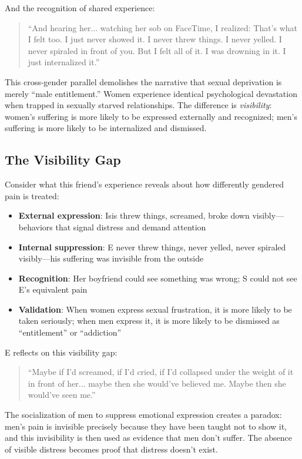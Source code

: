 \documentclass[12pt,openany]{book}
\numberwithin{equation}{chapter}
\begin{document}
And the recognition of shared experience:

\begin{quote}
``And hearing her... watching her sob on FaceTime, I realized: That's what I felt too. I just never showed it. I never threw things. I never yelled. I never spiraled in front of you. But I felt all of it. I was drowning in it. I just internalized it.''
\end{quote}

This cross-gender parallel demolishes the narrative that sexual deprivation is merely ``male entitlement.'' Women experience identical psychological devastation when trapped in sexually starved relationships. The difference is \textit{visibility}: women's suffering is more likely to be expressed externally and recognized; men's suffering is more likely to be internalized and dismissed.

\subsection{The Visibility Gap}

Consider what this friend's experience reveals about how differently gendered pain is treated:

\begin{itemize}
    \item \textbf{External expression}: Isis threw things, screamed, broke down visibly---behaviors that signal distress and demand attention
    \item \textbf{Internal suppression}: E never threw things, never yelled, never spiraled visibly---his suffering was invisible from the outside
    \item \textbf{Recognition}: Her boyfriend could see something was wrong; S could not see E's equivalent pain
    \item \textbf{Validation}: When women express sexual frustration, it is more likely to be taken seriously; when men express it, it is more likely to be dismissed as ``entitlement'' or ``addiction''
\end{itemize}

E reflects on this visibility gap:

\begin{quote}
``Maybe if I'd screamed, if I'd cried, if I'd collapsed under the weight of it in front of her... maybe then she would've believed me. Maybe then she would've seen me.''
\end{quote}

The socialization of men to suppress emotional expression creates a paradox: men's pain is invisible precisely because they have been taught not to show it, and this invisibility is then used as evidence that men don't suffer. The absence of visible distress becomes proof that distress doesn't exist.
\end{document}
